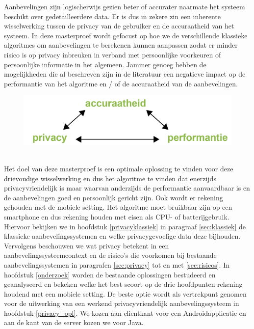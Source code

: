 Aanbevelingen zijn logischerwijs gezien beter of accurater naarmate het systeem beschikt over gedetailleerdere data. Er is dus in zekere zin een inherente wisselwerking tussen de privacy van de gebruiker en de accuraatheid van het systeem. In deze masterproef wordt gefocust op hoe we de verschillende klassieke algoritmes om aanbevelingen te berekenen kunnen aanpassen zodat er minder risico is op privacy inbreuken in verband met persoonlijke voorkeuren of persoonlijke informatie in het algemeen. Jammer genoeg hebben de mogelijkheden die al beschreven zijn in de literatuur een negatieve impact op de performantie van het algoritme en / of de accuraatheid van de aanbevelingen. 
\begin{figure}[htpb]   
    \label{Figuur::wisselwerking}      
  \begin{center}    
 \includegraphics[width=\textwidth,height=\textheight,keepaspectratio]{fig/wisselwerking}    
  \end{center}     
   \end{figure}\\
Het doel van deze masterproef is een optimale oplossing te vinden voor deze drievoudige wisselwerking en dus het algoritme te vinden dat enerzijds privacyvriendelijk is maar waarvan anderzijds de performantie aanvaardbaar is en de aanbevelingen goed en persoonlijk gericht zijn. Ook wordt er rekening gehouden met de mobiele setting. Het algoritme moet bruikbaar zijn op een smartphone en dus rekening houden met eisen als CPU- of batterijgebruik.\\

Hiervoor bekijken we in hoofdstuk \ref{privacyklassiek} in paragraaf \ref{sec:klassiek} de klassieke aanbevelingssystemen en welke privacygevoelige data deze bijhouden. Vervolgens beschouwen we wat privacy betekent in een aanbevelingssysteemcontext en de risico’s die voorkomen bij bestaande aanbevelingssystemen in paragrafen \ref{sec:privacy} tot en met \ref{sec:risicos}. In hoofdstuk \ref{onderzoek} worden de bestaande oplossingen bestudeerd en geanalyseerd en bekeken welke het best scoort op de drie hoofdpunten rekening houdend met een mobiele setting. De beste optie wordt als vertrekpunt genomen voor de uitwerking van een werkend privacyvriendelijk aanbevelingssysteem in hoofdstuk \ref{privacy_opl}. We kozen aan clientkant voor een Androidapplicatie en aan de kant van de server kozen we voor Java.
 
